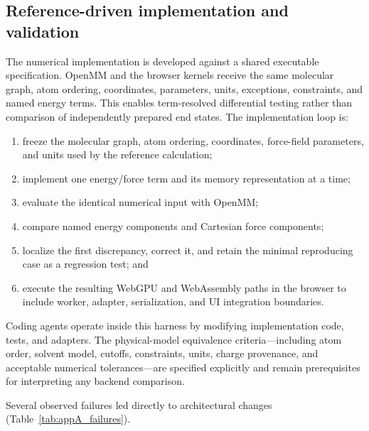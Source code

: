 \documentclass[11pt]{article}
\begin{document}
\begin{small}
\subsection{Reference-driven implementation and validation}

The numerical implementation is developed against a shared executable specification. OpenMM and the browser kernels receive the same molecular graph, atom ordering, coordinates, parameters, units, exceptions, constraints, and named energy terms. This enables term-resolved differential testing rather than comparison of independently prepared end states. The implementation loop is:

\begin{enumerate}[leftmargin=*]
\item freeze the molecular graph, atom ordering, coordinates, force-field parameters, and units used by the reference calculation;
\item implement one energy/force term and its memory representation at a time;
\item evaluate the identical numerical input with OpenMM;
\item compare named energy components and Cartesian force components;
\item localize the first discrepancy, correct it, and retain the minimal reproducing case as a regression test; and
\item execute the resulting WebGPU and WebAssembly paths in the browser to include worker, adapter, serialization, and UI integration boundaries.
\end{enumerate}

Coding agents operate inside this harness by modifying implementation code, tests, and adapters. The physical-model equivalence criteria---including atom order, solvent model, cutoffs, constraints, units, charge provenance, and acceptable numerical tolerances---are specified explicitly and remain prerequisites for interpreting any backend comparison.

Several observed failures led directly to architectural changes (Table~\ref{tab:appA_failures}).


\end{small}
\end{document}
